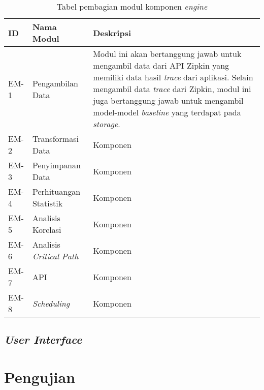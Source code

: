 \begin{small}
	\begin{longtable}{ | p{1cm} | p{3cm} | p{10cm} | }
		\caption{Tabel pembagian modul komponen \textit{engine}}
		\label{engine-module}                                                           
		\\ \hline
		\centering\bfseries{ID} & \centering\bfseries{Nama Modul} & \centering\bfseries{Deskripsi} \tabularnewline \hline
		\endfirsthead
		EM-1 & Pengambilan Data & Modul ini akan bertanggung jawab untuk mengambil data dari API Zipkin yang memiliki data hasil \textit{trace} dari aplikasi. Selain mengambil data \textit{trace} dari Zipkin, modul ini juga bertanggung jawab untuk mengambil model-model \textit{baseline} yang terdapat pada \textit{storage}. \\ \hline
		EM-2 & Transformasi Data & Komponen \\ \hline
		EM-3 & Penyimpanan Data & Komponen \\ \hline
		EM-4 & Perhituangan Statistik & Komponen \\ \hline
		EM-5 & Analisis Korelasi & Komponen \\ \hline
		EM-6 & Analisis \textit{Critical Path} & Komponen \\ \hline
		EM-7 & API & Komponen \\ \hline
		EM-8 & \textit{Scheduling} & Komponen \\ \hline
	\end{longtable}
\end{small}

%		

\subsection{\textit{User Interface}}


\section{Pengujian}
